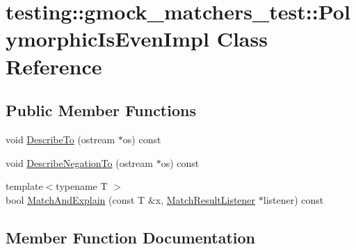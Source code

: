 \hypertarget{classtesting_1_1gmock__matchers__test_1_1_polymorphic_is_even_impl}{}\section{testing\+:\+:gmock\+\_\+matchers\+\_\+test\+:\+:Polymorphic\+Is\+Even\+Impl Class Reference}
\label{classtesting_1_1gmock__matchers__test_1_1_polymorphic_is_even_impl}
\subsection*{Public Member Functions}
\begin{DoxyCompactItemize}
\item 
void \hyperlink{classtesting_1_1gmock__matchers__test_1_1_polymorphic_is_even_impl_aa1ba79368840cfa6766405c8038a8695}{Describe\+To} (ostream $\ast$os) const 
\item 
void \hyperlink{classtesting_1_1gmock__matchers__test_1_1_polymorphic_is_even_impl_aa6ae4046ea5663d64cd21a7fb0686658}{Describe\+Negation\+To} (ostream $\ast$os) const 
\item 
{\footnotesize template$<$typename T $>$ }\\bool \hyperlink{classtesting_1_1gmock__matchers__test_1_1_polymorphic_is_even_impl_a85db513ebaeae37ee3f4b9d1b58fa94d}{Match\+And\+Explain} (const T \&x, \hyperlink{classtesting_1_1_match_result_listener}{Match\+Result\+Listener} $\ast$listener) const 
\end{DoxyCompactItemize}


\subsection{Member Function Documentation}
